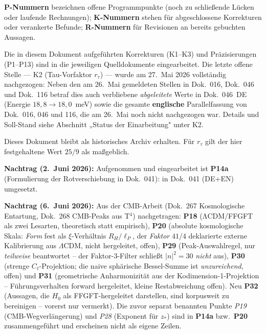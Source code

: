 \medskip


\smallskip
\noindent\textbf{P-Nummern} bezeichnen offene Programmpunkte (noch zu
schließende Lücken oder laufende Rechnungen); \textbf{K-Nummern} stehen
für abgeschlossene Korrekturen oder verankerte Befunde; \textbf{R-Nummern}
für Revisionen an bereits gebuchten Aussagen.

\medskip
Die in diesem Dokument aufgeführten Korrekturen (K1–K3) und
Präzisierungen (P1–P13) sind in die jeweiligen Quelldokumente
eingearbeitet. Die letzte offene Stelle --- K2 (Tau-Vorfaktor
$r_\tau$) --- wurde am 27.~Mai 2026 vollständig nachgezogen: Neben den am
26.~Mai gemeldeten Stellen in Dok.~016, Dok.~046 und Dok.~116 betraf dies
auch verbliebene \emph{abgeleitete} Werte in Dok.~046~DE (Energie
$18{,}8 \to 18{,}0$~meV) sowie die gesamte \textbf{englische} Parallelfassung
von Dok.~016, 046 und 116, die am 26.~Mai noch nicht nachgezogen war.
Details und Soll-Stand siehe Abschnitt „Status der Einarbeitung" unter K2.

Dieses Dokument bleibt als historisches Archiv erhalten.
Für $r_\tau$ gilt der hier festgehaltene Wert $25/9$ als maßgeblich.

\medskip

\textbf{Nachtrag (2.~Juni 2026):} Aufgenommen und eingearbeitet ist \textbf{P14a}
(Formulierung der Rotverschiebung in Dok.~041): in Dok.~041 (DE+EN) umgesetzt.

\medskip

\textbf{Nachtrag (6.~Juni 2026):} Aus der CMB-Arbeit (Dok.~267 Kosmologische
Entartung, Dok.~268 CMB-Peaks aus T$^4$) nachgetragen: \textbf{P18}
(ΛCDM/FFGFT als zwei Lesarten, theoretisch statt empirisch),
\textbf{P20} (absolute kosmologische Skala: \emph{Form} fest als $\xi$-Verhältnis $R_H/\ell_P$, der \emph{Faktor} $41/4$ deklarierte externe Kalibrierung aus $\Lambda$CDM, nicht hergeleitet, offen), \textbf{P29} (Peak-Auswahlregel,
nur \emph{teilweise} beantwortet -- der Faktor-3-Filter schließt $|n|^2=30$
\emph{nicht} aus), \textbf{P30} (strenge $C_\ell$-Projektion; die naive
sphärische Bessel-Summe ist \emph{unzureichend}, offen) und \textbf{P31}
(geometrische Anharmonizität aus der Kodimension-1-Projektion -- Führungsverhalten
forward hergeleitet, kleine Restabweichung offen). Neu \textbf{P32} (Aussagen, die $H_0$ als FFGFT-hergeleitet darstellen, sind korpusweit zu bereinigen -- vorerst nur vermerkt). Die zuvor separat benannten Punkte
\emph{P19} (CMB-Wegverlängerung) und \emph{P28} (Exponent für $z_*$) sind in
\textbf{P14a} bzw.\ \textbf{P20} zusammengeführt und erscheinen nicht als
eigene Zeilen.

